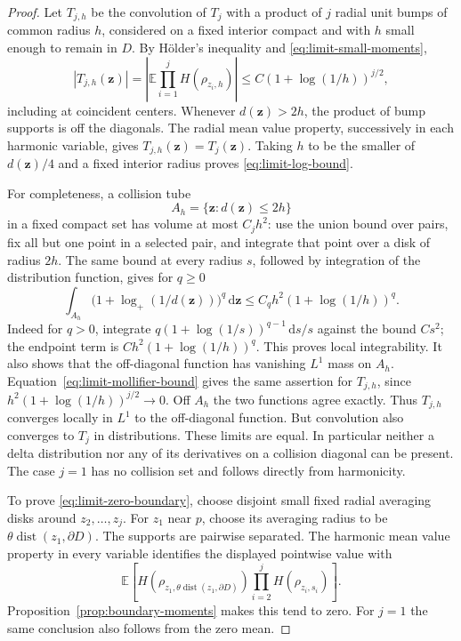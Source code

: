 \documentclass[11pt]{article}
\newcommand{\E}{\mathbb E}
\newcommand{\dd}{\,\mathrm d}
\DeclareMathOperator{\dist}{dist}
\theoremstyle{definition}
\theoremstyle{remark}
\numberwithin{equation}{section}
\begin{document}
\begin{proof}
Let \(T_{j,h}\) be the convolution of \(T_j\) with a product of
\(j\) radial unit bumps of common radius \(h\), considered on a
fixed interior compact and with \(h\) small enough to remain in
\(D\).  By H\"older's inequality and
\eqref{eq:limit-small-moments},
\begin{equation}
 |T_{j,h}(\mathbf z)|
   =\left|\E\prod_{i=1}^jH(\rho_{z_i,h})\right|
   \le C(1+\log(1/h))^{j/2},
 \label{eq:limit-mollifier-bound}
\end{equation}
including at coincident centers.  Whenever \(d(\mathbf z)>2h\),
the product of bump supports is off the diagonals.  The radial mean
value property, successively in each harmonic variable, gives
\(T_{j,h}(\mathbf z)=T_j(\mathbf z)\).
Taking \(h\) to be the smaller of \(d(\mathbf z)/4\) and a fixed
interior radius proves \eqref{eq:limit-log-bound}.

For completeness, a collision tube
\[
       A_h=\{\mathbf z:d(\mathbf z)\le2h\}
\]
in a fixed compact set has volume at most \(C_jh^2\): use the
union bound over pairs, fix all but one point in a selected pair,
and integrate that point over a disk of radius \(2h\).
The same bound at every radius \(s\), followed by integration of
the distribution function, gives for \(q\ge0\)
\[
 \int_{A_h}\bigl(1+\log_+(1/d(\mathbf z))\bigr)^q\dd\mathbf z
       \le C_qh^2(1+\log(1/h))^q.
\]
Indeed for \(q>0\), integrate
\(q(1+\log(1/s))^{q-1}\dd s/s\) against the bound \(Cs^2\);
the endpoint term is \(Ch^2(1+\log(1/h))^q\).
This proves local integrability.  It also shows that the
off-diagonal function has vanishing \(L^1\) mass on \(A_h\).
Equation~\eqref{eq:limit-mollifier-bound} gives the same assertion
for \(T_{j,h}\), since \(h^2(1+\log(1/h))^{j/2}\to0\).
Off \(A_h\) the two functions agree exactly.  Thus \(T_{j,h}\)
converges locally in \(L^1\) to the off-diagonal function.
But convolution also converges to \(T_j\) in distributions.
These limits are equal.  In particular neither a delta distribution
nor any of its derivatives on a collision diagonal can be present.
The case \(j=1\) has no collision set and follows directly from
harmonicity.

To prove \eqref{eq:limit-zero-boundary}, choose disjoint small fixed
radial averaging disks around \(z_2,\ldots,z_j\).
For \(z_1\) near \(p\), choose its averaging radius to be
\(\theta\dist(z_1,\partial D)\).
The supports are pairwise separated.  The harmonic mean value
property in every variable identifies the displayed pointwise
value with
\[
 \E\left[H(\rho_{z_1,\theta\dist(z_1,\partial D)})
                         \prod_{i=2}^jH(\rho_{z_i,s_i})\right].
\]
Proposition~\ref{prop:boundary-moments} makes this tend to zero.
For \(j=1\) the same conclusion also follows from the zero mean.
\end{proof}
\end{document}
